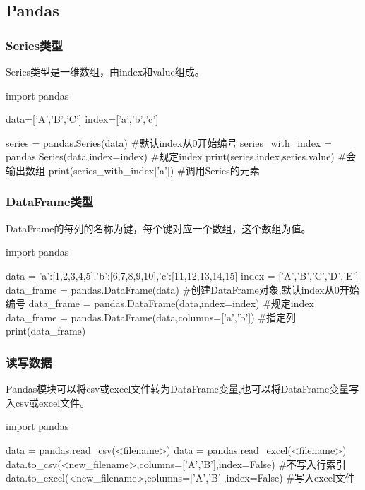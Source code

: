 \documentclass{article}
\begin{document}
    \subsection{Pandas}
      \subsubsection{Series类型}
        Series类型是一维数组，由index和value组成。
        \begin{codeblock}[language=python, caption={Series in Pandas}]
          import pandas

          data=['A','B','C']
          index=['a','b','c']
          
          series = pandas.Series(data) #默认index从0开始编号
          series_with_index = pandas.Series(data,index=index) #规定index
          print(series.index,series.value) #会输出数组
          print(series_with_index['a']) #调用Series的元素
        \end{codeblock}

      \subsubsection{DataFrame类型}
        DataFrame的每列的名称为键，每个键对应一个数组，这个数组为值。
        \begin{codeblock}[language=python, caption={Create a dataframe}]
          import pandas

          data = {'a':[1,2,3,4,5],'b':[6,7,8,9,10],'c':[11,12,13,14,15]}
          index = ['A','B','C','D','E']
          data_frame = pandas.DataFrame(data) #创建DataFrame对象,默认index从0开始编号
          data_frame = pandas.DataFrame(data,index=index) #规定index
          data_frame = pandas.DataFrame(data,columns=['a','b']) #指定列
          print(data_frame)
        \end{codeblock}

      \subsubsection{读写数据}
        Pandas模块可以将csv或excel文件转为DataFrame变量,也可以将DataFrame变量写入csv或excel文件。
        \begin{codeblock}[language=python, caption={Read and write files using Pandas}]
          import pandas

          data = pandas.read_csv(<filename>)
          data = pandas.read_excel(<filename>)
          data.to_csv(<new_filename>,columns=['A','B'],index=False) #不写入行索引
          data.to_excel(<new_filename>,columns=['A','B'],index=False) #写入excel文件
        \end{codeblock}
\end{document}
